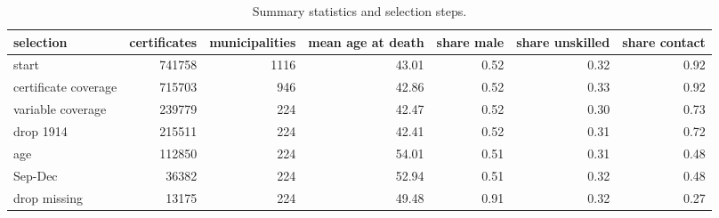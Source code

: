 \begin{table}

\caption{\label{tab:tab:sumselect}Summary statistics and selection steps.}
\centering
\begin{tabular}[t]{l|r|r|r|r|r|r}
\hline
selection & certificates & municipalities & mean age at death & share male & share unskilled & share contact\\
\hline
start & 741758 & 1116 & 43.01 & 0.52 & 0.32 & 0.92\\
\hline
certificate coverage & 715703 & 946 & 42.86 & 0.52 & 0.33 & 0.92\\
\hline
variable coverage & 239779 & 224 & 42.47 & 0.52 & 0.30 & 0.73\\
\hline
drop 1914 & 215511 & 224 & 42.41 & 0.52 & 0.31 & 0.72\\
\hline
age & 112850 & 224 & 54.01 & 0.51 & 0.31 & 0.48\\
\hline
Sep-Dec & 36382 & 224 & 52.94 & 0.51 & 0.32 & 0.48\\
\hline
drop missing & 13175 & 224 & 49.48 & 0.91 & 0.32 & 0.27\\
\hline
\end{tabular}
\end{table}

